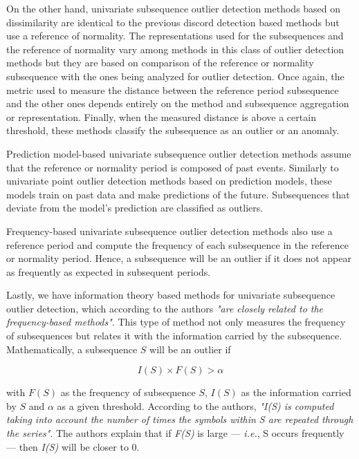 On the other hand, univariate subsequence outlier detection methods based on dissimilarity are identical to the previous discord detection based methods but use a reference of normality. The representations used for the subsequences and the reference of normality vary among methods in this class of outlier detection methods but they are based on comparison of the reference or normality subsequence with the ones being analyzed for outlier detection. Once again, the metric used to measure the distance between the reference period subsequence and the other ones depends entirely on the method and subsequence aggregation or representation. Finally, when the measured distance is above a certain threshold, these methods classify the subsequence as an outlier or an anomaly.

Prediction model-based univariate subsequence outlier detection methods assume that the reference or normality period is composed of past events. Similarly to univariate point outlier detection methods based on prediction models, these models train on past data and make predictions of the future. Subsequences that deviate from the model's prediction are classified as outliers.

Frequency-based univariate subsequence outlier detection methods also use a reference period and compute the frequency of each subsequence in the reference or normality period. Hence, a subsequence will be an outlier if it does not appear as frequently as expected in subsequent periods.

Lastly, we have information theory based methods for univariate subsequence outlier detection, which according to the authors \textit{"are closely related to the frequency-based methods"}. This type of method not only measures the frequency of subsequences but relates it with the information carried by the subsequence. Mathematically, a subsequence $S$ will be an outlier if

\begin{equation*}
    I(S) \times F(S) > \alpha
\end{equation*}

with $F(S)$ as the frequency of subsequence $S$, $I(S)$ as the information carried by $S$ and $\alpha$ as a given threshold. According to the authors, \textit{"I(S) is computed taking into account the number of times the symbols within S are repeated through the series"}. The authors explain that if \textit{F(S)} is large --- \textit{i.e.}, S occurs frequently --- then \textit{I(S)} will be closer to 0.

